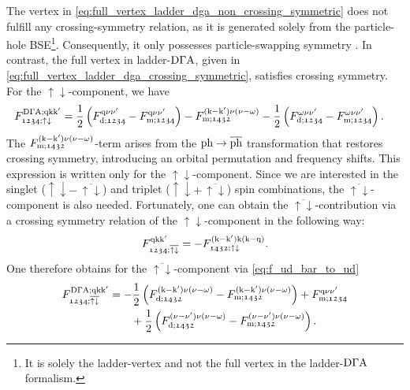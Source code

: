 \documentclass[../../main.tex]{subfiles}
\begin{document}
The vertex in \eqref{eq:full_vertex_ladder_dga_non_crossing_symmetric} does not fulfill any crossing-symmetry relation, as it is generated solely from the particle-hole BSE\footnote{It is solely the ladder-vertex and not the full vertex in the ladder-$\text{D}\Gamma\text{A}$ formalism.}. Consequently, it only possesses particle-swapping symmetry \cite{Galler2017}. In contrast, the full vertex in ladder-$\text{D}\Gamma\text{A}$, given in \eqref{eq:full_vertex_ladder_dga_crossing_symmetric}, satisfies crossing symmetry. For the $\uparrow\downarrow$-component, we have \cite{Galler2017, Rohringer2013}
\begin{align}
	F^{\text{D}\Gamma\text{A};\text{q}\text{k}\text{k}'}_{\mathfrak{1234};\uparrow\downarrow}&=\frac12\left (F_{\text{d};\mathfrak{1234}}^{\text{q}\nu\nu'}-F_{\text{m};\mathfrak{1234}}^{\text{q}\nu\nu'}\right )-F_{\text{m};\mathfrak{1432}}^{(\text{k}-\text{k}')\nu(\nu-\omega)}-\frac12\left (F_{\text{d};\mathfrak{1234}}^{\omega\nu\nu'}-F_{\text{m};\mathfrak{1234}}^{\omega\nu\nu'}\right ).
\end{align}
The $F_{\text{m};\mathfrak{1432}}^{(\text{k}-\text{k}')\nu(\nu-\omega)}$-term arises from the $\text{ph}\to\overline{\text{ph}}$ transformation that restores crossing symmetry, introducing an orbital permutation and frequency shifts. This expression is written only for the $\uparrow\downarrow$-component. Since we are interested in the singlet ($\uparrow\downarrow-\,\overline{\uparrow\downarrow}$) and triplet ($\uparrow\downarrow+\,\overline{\uparrow\downarrow}$) spin combinations, the $\overline{\uparrow\downarrow}$-component is also needed. Fortunately, one can obtain the $\overline{\uparrow\downarrow}$-contribution via a crossing symmetry relation of the $\uparrow\downarrow$-component in the following way:
\begin{align}\label{eq:f_ud_bar_to_ud}
	F^{\text{q}\text{k}\text{k}'}_{\mathfrak{1234};\overline{\uparrow\downarrow}}=-F^{(\text{k}-\text{k}')\text{k}(\text{k}-\text{q})}_{\mathfrak{1432};\uparrow\downarrow}.
\end{align}
One therefore obtains for the $\overline{\uparrow\downarrow}$-component via \eqref{eq:f_ud_bar_to_ud}
\begin{align}
\begin{split}
	F^{\text{D}\Gamma\text{A};\text{q}\text{k}\text{k}'}_{\mathfrak{1234};\overline{\uparrow\downarrow}}&=-\frac12\left (F_{\text{d};\mathfrak{1432}}^{(\text{k}-\text{k}')\nu(\nu-\omega)}-F_{\text{m};\mathfrak{1432}}^{(\text{k}-\text{k}')\nu(\nu-\omega)}\right )+F_{\text{m};\mathfrak{1234}}^{\text{q}\nu\nu'}\\
	&\qquad+\frac12\left (F_{\text{d};\mathfrak{1432}}^{(\nu-\nu')\nu(\nu-\omega)}-F_{\text{m};\mathfrak{1432}}^{(\nu-\nu')\nu(\nu-\omega)}\right ).
\end{split}
\end{align}
\end{document}
